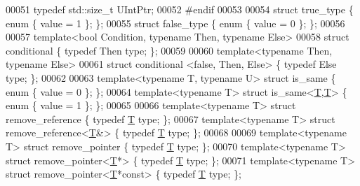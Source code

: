 \begin{DoxyCode}
00051 \textcolor{keyword}{typedef} std::size\_t UIntPtr;
00052 \textcolor{preprocessor}{#endif}
00053 
00054 \textcolor{keyword}{struct }true\_type \{  \textcolor{keyword}{enum} \{ value = 1 \}; \};
00055 \textcolor{keyword}{struct }false\_type \{ \textcolor{keyword}{enum} \{ value = 0 \}; \};
00056 
00057 \textcolor{keyword}{template}<\textcolor{keywordtype}{bool} Condition, \textcolor{keyword}{typename} Then, \textcolor{keyword}{typename} Else>
00058 \textcolor{keyword}{struct }conditional \{ \textcolor{keyword}{typedef} Then type; \};
00059 
00060 \textcolor{keyword}{template}<\textcolor{keyword}{typename} Then, \textcolor{keyword}{typename} Else>
00061 \textcolor{keyword}{struct }conditional <false, Then, Else> \{ \textcolor{keyword}{typedef} Else type; \};
00062 
00063 \textcolor{keyword}{template}<\textcolor{keyword}{typename} T, \textcolor{keyword}{typename} U> \textcolor{keyword}{struct }is\_same \{ \textcolor{keyword}{enum} \{ value = 0 \}; \};
00064 \textcolor{keyword}{template}<\textcolor{keyword}{typename} T> \textcolor{keyword}{struct }is\_same<\hyperlink{group___sparse_core___module_class_eigen_1_1_triplet}{T},\hyperlink{group___sparse_core___module_class_eigen_1_1_triplet}{T}> \{ \textcolor{keyword}{enum} \{ value = 1 \}; \};
00065 
00066 \textcolor{keyword}{template}<\textcolor{keyword}{typename} T> \textcolor{keyword}{struct }remove\_reference \{ \textcolor{keyword}{typedef} \hyperlink{group___sparse_core___module_class_eigen_1_1_triplet}{T} type; \};
00067 \textcolor{keyword}{template}<\textcolor{keyword}{typename} T> \textcolor{keyword}{struct }remove\_reference<\hyperlink{group___sparse_core___module_class_eigen_1_1_triplet}{T}&> \{ \textcolor{keyword}{typedef} \hyperlink{group___sparse_core___module_class_eigen_1_1_triplet}{T} type; \};
00068 
00069 \textcolor{keyword}{template}<\textcolor{keyword}{typename} T> \textcolor{keyword}{struct }remove\_pointer \{ \textcolor{keyword}{typedef} \hyperlink{group___sparse_core___module_class_eigen_1_1_triplet}{T} type; \};
00070 \textcolor{keyword}{template}<\textcolor{keyword}{typename} T> \textcolor{keyword}{struct }remove\_pointer<\hyperlink{group___sparse_core___module_class_eigen_1_1_triplet}{T}*> \{ \textcolor{keyword}{typedef} \hyperlink{group___sparse_core___module_class_eigen_1_1_triplet}{T} type; \};
00071 \textcolor{keyword}{template}<\textcolor{keyword}{typename} T> \textcolor{keyword}{struct }remove\_pointer<\hyperlink{group___sparse_core___module_class_eigen_1_1_triplet}{T}*\textcolor{keyword}{const}> \{ \textcolor{keyword}{typedef} \hyperlink{group___sparse_core___module_class_eigen_1_1_triplet}{T} type; \};

\end{DoxyCode}
